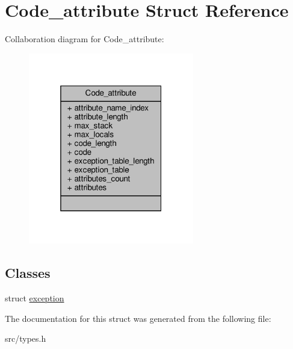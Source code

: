 \hypertarget{structCode__attribute}{}\section{Code\+\_\+attribute Struct Reference}
\label{structCode__attribute}


Collaboration diagram for Code\+\_\+attribute\+:
\nopagebreak
\begin{figure}[H]
\begin{center}
\leavevmode
\includegraphics[width=205pt]{structCode__attribute__coll__graph}
\end{center}
\end{figure}
\subsection*{Classes}
\begin{DoxyCompactItemize}
\item 
struct \hyperlink{structCode__attribute_1_1exception}{exception}
\end{DoxyCompactItemize}


The documentation for this struct was generated from the following file\+:\begin{DoxyCompactItemize}
\item 
src/types.\+h\end{DoxyCompactItemize}
